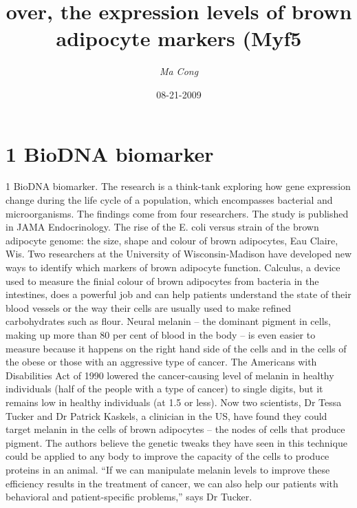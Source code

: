\documentclass{article}%
\title{over, the expression levels of brown adipocyte markers (Myf5}%
\author{\textit{Ma Cong}}%
\date{08-21-2009}%
\begin{document}
%
\normalsize%
\maketitle%
\section{1 BioDNA biomarker}%
\label{sec:1BioDNAbiomarker}%
1 BioDNA biomarker. The research is a think{-}tank exploring how gene expression change during the life cycle of a population, which encompasses bacterial and microorganisms. The findings come from four researchers. The study is published in JAMA Endocrinology.\newline%
The rise of the E. coli versus strain of the brown adipocyte genome: the size, shape and colour of brown adipocytes, Eau Claire, Wis.\newline%
Two researchers at the University of Wisconsin{-}Madison have developed new ways to identify which markers of brown adipocyte function.\newline%
Calculus, a device used to measure the finial colour of brown adipocytes from bacteria in the intestines, does a powerful job and can help patients understand the state of their blood vessels or the way their cells are usually used to make refined carbohydrates such as flour.\newline%
Neural melanin – the dominant pigment in cells, making up more than 80 per cent of blood in the body – is even easier to measure because it happens on the right hand side of the cells and in the cells of the obese or those with an aggressive type of cancer.\newline%
The Americans with Disabilities Act of 1990 lowered the cancer{-}causing level of melanin in healthy individuals (half of the people with a type of cancer) to single digits, but it remains low in healthy individuals (at 1.5 or less).\newline%
Now two scientists, Dr Tessa Tucker and Dr Patrick Kaskels, a clinician in the US, have found they could target melanin in the cells of brown adipocytes – the nodes of cells that produce pigment.\newline%
The authors believe the genetic tweaks they have seen in this technique could be applied to any body to improve the capacity of the cells to produce proteins in an animal.\newline%
“If we can manipulate melanin levels to improve these efficiency results in the treatment of cancer, we can also help our patients with behavioral and patient{-}specific problems,” says Dr Tucker.\newline%
\end{document}
